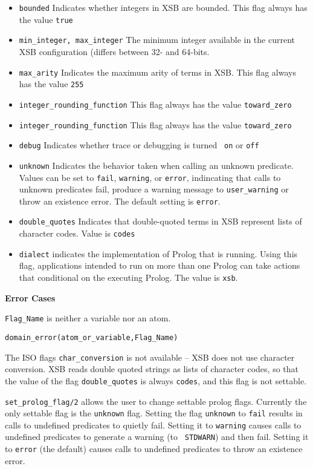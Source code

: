\begin{description}
\begin{itemize}
\item {\tt bounded} Indicates whether integers in XSB are bounded.
  This flag always has the value {\tt true}
%
\item {\tt min\_integer, max\_integer} The minimum integer available in the current
  XSB configuration (differs between 32- and 64-bits.
%
\item {\tt max\_arity} Indicates the maximum arity of terms in XSB.
  This flag always has the value {\tt 255}
%
\item {\tt integer\_rounding\_function} This flag always has the value
  {\tt toward\_zero}
%
\item {\tt integer\_rounding\_function} This flag always has the value
  {\tt toward\_zero}
%
\item {\tt debug} Indicates whether trace or debugging is turned {\tt
  on} or {\tt off}
%
\item {\tt unknown} Indicates the behavior taken when calling an
  unknown predicate.  Values can be set to {\tt fail}, {\tt warning},
  or {\tt error}, indincating that calls to unknown predicates fail,
  produce a warning message to {\tt user\_warning} or throw an
  existence error.  The default setting is {\tt error}.
%
\item {\tt double\_quotes} Indicates that double-quoted terms in XSB
  represent lists of character codes.  Value is {\tt codes}
%
\item {\tt dialect} indicates the implementation of Prolog that is
  running.  Using this flag, applications intended to run on more than
  one Prolog can take actions that conditional on the executing
  Prolog.  The value is {\tt xsb}.
\end{itemize}

{\bf Error Cases}
\bi
\item 	{\tt Flag\_Name} is neither a variable nor an atom.
\bi
\item 	{\tt domain\_error(atom\_or\_variable,Flag\_Name)}
\ei
\ei

\compatability The ISO flags {\tt char\_conversion} is not available
-- XSB does not use character conversion.  XSB reads double quoted
strings as lists of character codes, so that the value of the flag
{\tt double\_quotes} is always {\tt codes}, and this flag is not
settable.

%
{\tt set\_prolog\_flag/2} allows the user to change settable prolog
flags.  Currently the only settable flag is the {\tt unknown} flag.
Setting the flag {\tt unknown} to {\tt fail} results in calls to
undefined predicates to quietly fail.  Setting it to {\tt warning}
causes calls to undefined predicates to generate a warning (to {\tt
  STDWARN}) and then fail.  Setting it to {\tt error} (the default)
causes calls to undefined predicates to throw an existence error.


\end{description}
